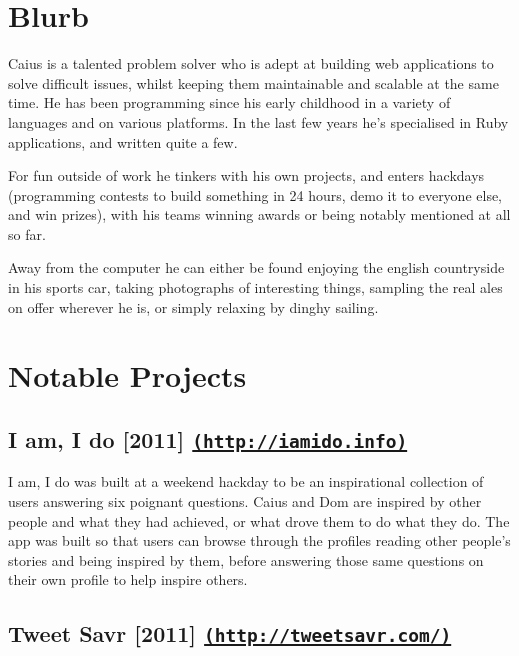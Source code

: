 \documentclass[letterpaper]{article}
\def\name{Caius Durling}
\begin{document}
\rightline{\huge \name}


\section*{Blurb}

Caius is a talented problem solver who is adept at building web applications to solve difficult issues, whilst keeping them maintainable and scalable at the same time. He has been programming since his early childhood in a variety of languages and on various platforms. In the last few years he's specialised in Ruby applications, and written quite a few.

For fun outside of work he tinkers with his own projects, and enters hackdays (programming contests to build something in 24 hours, demo it to everyone else, and win prizes), with his teams winning awards or being notably mentioned at all so far.

Away from the computer he can either be found enjoying the english countryside in his sports car, taking photographs of interesting things, sampling the real ales on offer wherever he is, or simply relaxing by dinghy sailing.

\section*{Notable Projects}

\subsection*{I am, I do [2011] \href{http://iamido.info/}{\tt (http://iamido.info)}} %
\label{sub:i_am_i_do}

I am, I do was built at a weekend hackday to be an inspirational collection of users answering six poignant questions. Caius and Dom are inspired by other people and what they had achieved, or what drove them to do what they do. The app was built so that users can browse through the profiles reading other people's stories and being inspired by them, before answering those same questions on their own profile to help inspire others.


\subsection*{Tweet Savr [2011] \href{http://tweetsavr.com/}{\tt (http://tweetsavr.com/)}} %
\label{sub:tweet_savr}
\end{document}
